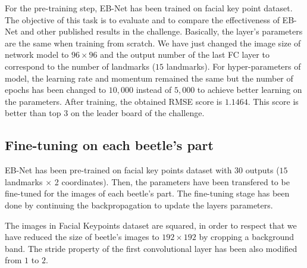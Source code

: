 \documentclass[review]{elsarticle}
\begin{document}
For the pre-training step, EB-Net has been trained on facial key point dataset. The objective of this task is to evaluate and to compare the effectiveness of EB-Net and other published results in the challenge. Basically, the layer's parameters are the same when training from scratch. We have just changed the image size of network model to $96 \times 96$ and the output number of the last FC layer to correspond to the number of landmarks ($15$ landmarks). For hyper-parameters of model, the learning rate and momentum remained the same but the number of epochs has been changed to $10,000$ instead of $5,000$ to achieve better learning on the parameters. After training, the obtained RMSE score is $1.1464$. This score is better than top $3$ on the leader board of the challenge.
\subsection{Fine-tuning on each beetle's part}
EB-Net has been pre-trained on facial key points dataset with $30$ outputs ($15$ landmarks $\times$ 2 coordinates). Then, the parameters have been transfered to be fine-tuned for the images of each beetle's part. The fine-tuning stage has been done by continuing the backpropagation to update the layers parameters.

The images in Facial Keypoints dataset are squared, in order to respect that we have reduced the size of beetle's images to $192 \times 192$ by cropping a background band. The stride property of the first convolutional layer has been also modified from $1$ to $2$.
\end{document}
